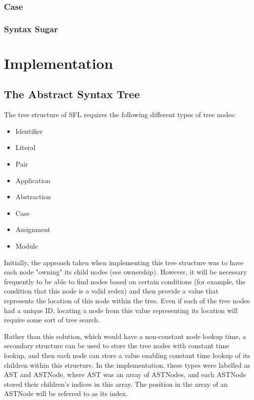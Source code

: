 \documentclass[
author=Kiran Sturt,
degree=BSc,
title=Implementing a Step by Step Evaluator for a Simple Functional Programming language,
unit=COMS30045,twoside]{dissertation}
\theoremstyle{definition}
\theoremstyle{break}
\theoremstyle{definition}
\begin{document}
\subsection{Case}

\subsection{Syntax Sugar}


\chapter{Implementation}
\label{chap:execution}

\section{The Abstract Syntax Tree}
The tree structure of SFL requires the following different types of tree nodes:
\begin{itemize}
    \item Identifier
    \item Literal
    \item Pair
    \item Application
    \item Abstraction
    \item Case
    \item Assignment
    \item Module
\end{itemize}
Initially, the approach taken when implementing this tree structure was to have each node "owning" its child nodes (see ownership). However, it will be necessary frequently to be able to find nodes based on certain conditions (for example, the condition that this node is a valid redex) and then provide a value that represents the location of this node within the tree. Even if each of the tree nodes had a unique ID, locating a node from this value representing its location will require some sort of tree search.

Rather than this solution, which would have a non-constant node lookup time, a secondary structure can be used to store the tree nodes with constant time lookup, and then each node can store a value enabling constant time lookup of its children within this structure. In the implementation, these types were labelled as AST and ASTNode, where AST was an array of ASTNodes, and each ASTNode stored their children's indices in this array. The position in the array of an ASTNode will be referred to as its index.
\end{document}
